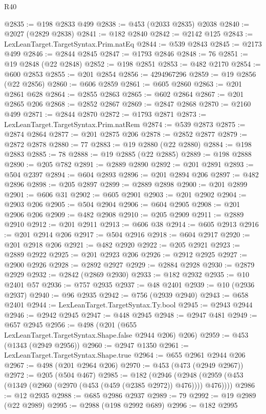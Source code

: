 \begin{lexlean}{R40}
\begin{coremodule}
@2835 := @198 @2833 @499
@2838 := @453 (@2033 @2835) @2038
@2840 := @2027 (@2829 @2838)
@2841 := @182 @2840
@2842 := @2142 @125
@2843 := LexLeanTarget.TargetSyntax.Prim.natEq
@2844 := @539 @2843
@2845 := @2173 @499
@2846 := @2844 @2845
@2847 := @1793 @2846
@2848 := 76
@2851 := @19 @2848 (@22 @2848)
@2852 := @198 @2851
@2853 := @482 @2170
@2854 := @600 @2853
@2855 := @201 @2854
@2856 := 4294967296
@2859 := @19 @2856 (@22 @2856)
@2860 := @606 @2859
@2861 := @605 @2860
@2863 := @201 @2861 @628
@2864 := @2855 @2863
@2865 := @602 @2864
@2867 := @201 @2865 @206
@2868 := @2852 @2867
@2869 := @2847 @2868
@2870 := @2160 @499
@2871 := @2844 @2870
@2872 := @1793 @2871
@2873 := LexLeanTarget.TargetSyntax.Prim.natRem
@2874 := @539 @2873
@2875 := @2874 @2864
@2877 := @201 @2875 @206
@2878 := @2852 @2877
@2879 := @2872 @2878
@2880 := 77
@2883 := @19 @2880 (@22 @2880)
@2884 := @198 @2883
@2885 := 78
@2888 := @19 @2885 (@22 @2885)
@2889 := @198 @2888
@2890 := @205 @782
@2891 := @2889 @2890
@2892 := @201 @2891
@2893 := @504 @2397
@2894 := @604 @2893
@2896 := @201 @2894 @206
@2897 := @482 @2896
@2898 := @205 @2897
@2899 := @2889 @2898
@2900 := @201 @2899
@2901 := @606 @31
@2902 := @605 @2901
@2903 := @201 @2902
@2904 := @2903 @206
@2905 := @504 @2904
@2906 := @604 @2905
@2908 := @201 @2906 @206
@2909 := @482 @2908
@2910 := @205 @2909
@2911 := @2889 @2910
@2912 := @201 @2911
@2913 := @606 @38
@2914 := @605 @2913
@2916 := @201 @2914 @206
@2917 := @504 @2916
@2918 := @604 @2917
@2920 := @201 @2918 @206
@2921 := @482 @2920
@2922 := @205 @2921
@2923 := @2889 @2922
@2925 := @201 @2923 @206
@2926 := @2912 @2925
@2927 := @2900 @2926
@2928 := @2892 @2927
@2929 := @2884 @2928
@2930 := @2879 @2929
@2932 := @2842 (@2869 @2930)
@2933 := @182 @2932
@2935 := @10 @2401 @57
@2936 := @757 @2935
@2937 := @48 @2401
@2939 := @10 (@2936 @2937)
@2940 := @96 @2935
@2942 := @756 (@2939 @2940)
@2943 := @658 @2401
@2944 := LexLeanTarget.TargetSyntax.Ty.bool
@2945 := @2943 @2944
@2946 := @2942 @2945
@2947 := @448 @2945
@2948 := @2947 @481
@2949 := @657 @2945
@2956 := @498 (@201 (@655 LexLeanTarget.TargetSyntax.Shape.false @2944 @206) @206)
@2959 := @453 (@1343 (@2949 @2956))
@2960 := @2947 @1350
@2961 := LexLeanTarget.TargetSyntax.Shape.true
@2964 := @655 @2961 @2944 @206
@2967 := @498 (@201 @2964 @206)
@2970 := @453 (@473 (@2949 @2967))
@2972 := @205 (@504 @467)
@2985 := @182
    (@2946 (@2948 (@2959 (@453 (@1349 (@2960 (@2970 (@453 (@459 (@2385 @2972)) @476)))) @476))))
@2986 := @12 @2935
@2988 := @685 @2986 @2937
@2989 := 79
@2992 := @19 @2989 (@22 @2989)
@2995 := @2988 (@198 @2992 @689)
@2996 := @182 @2995

\end{coremodule}
\end{lexlean}

